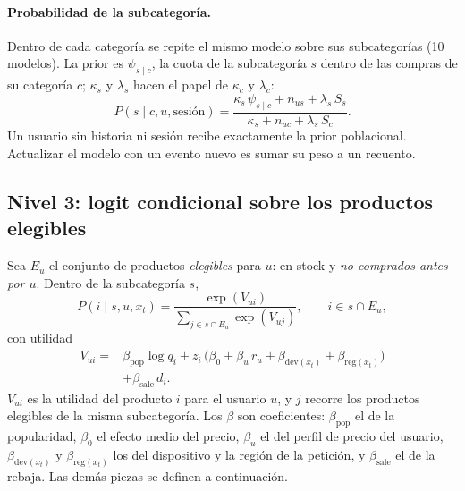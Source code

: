\documentclass[11pt,a4paper]{article}
\begin{document}
\paragraph{Probabilidad de la subcategoría.} Dentro de cada categoría se repite el mismo modelo sobre
sus subcategorías (10 modelos). La prior es $\psi_{s\mid c}$, la cuota de la subcategoría $s$ dentro de
las compras de su categoría $c$; $\kappa_s$ y $\lambda_s$ hacen el papel de $\kappa_c$ y $\lambda_c$:
\begin{equation}
P(s\mid c,u,\text{sesión})=\frac{\kappa_s\,\psi_{s\mid c}+n_{us}+\lambda_s\,S_s}{\kappa_s+n_{uc}+\lambda_s\,S_c}.
\label{eq:sub}
\end{equation}
Un usuario sin historia ni sesión recibe exactamente la prior poblacional. Actualizar el modelo con
un evento nuevo es sumar su peso a un recuento.

\subsection{Nivel 3: logit condicional sobre los productos elegibles}

Sea $E_u$ el conjunto de productos \emph{elegibles} para $u$: en stock y \emph{no comprados antes por
$u$}. Dentro de la subcategoría $s$,
\begin{equation}
P(i\mid s,u,x_t)=\frac{\exp(V_{ui})}{\sum_{j\in s\cap E_u}\exp(V_{uj})},\qquad i\in s\cap E_u, \label{eq:logit}
\end{equation}
con utilidad
\begin{equation}
\begin{aligned}
V_{ui}={}&\beta_{\text{pop}}\log q_i
+z_i\,\big(\beta_0+\beta_u\,r_u+\beta_{\text{dev}(x_t)}+\beta_{\text{reg}(x_t)}\big)\\
&+\beta_{\text{sale}}\,d_i .
\end{aligned}\label{eq:util}
\end{equation}
$V_{ui}$ es la utilidad del producto $i$ para el usuario $u$, y $j$ recorre los productos elegibles de
la misma subcategoría. Los $\beta$ son coeficientes: $\beta_{\text{pop}}$ el de la popularidad,
$\beta_0$ el efecto medio del precio, $\beta_u$ el del perfil de precio del usuario,
$\beta_{\text{dev}(x_t)}$ y $\beta_{\text{reg}(x_t)}$ los del dispositivo y la región de la petición, y
$\beta_{\text{sale}}$ el de la rebaja. Las demás piezas se definen a continuación.
\end{document}
